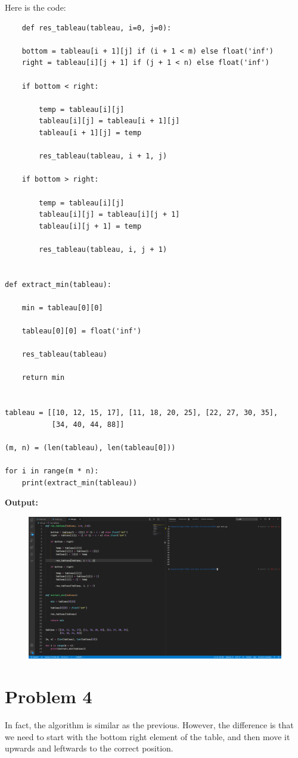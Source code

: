 \documentclass{article}
\begin{document}
Here is the code:
\begin{lstlisting}
    def res_tableau(tableau, i=0, j=0):

    bottom = tableau[i + 1][j] if (i + 1 < m) else float('inf')
    right = tableau[i][j + 1] if (j + 1 < n) else float('inf')

    if bottom < right:

        temp = tableau[i][j]
        tableau[i][j] = tableau[i + 1][j]
        tableau[i + 1][j] = temp

        res_tableau(tableau, i + 1, j)

    if bottom > right:

        temp = tableau[i][j]
        tableau[i][j] = tableau[i][j + 1]
        tableau[i][j + 1] = temp

        res_tableau(tableau, i, j + 1)


def extract_min(tableau):

    min = tableau[0][0]

    tableau[0][0] = float('inf')

    res_tableau(tableau)

    return min


tableau = [[10, 12, 15, 17], [11, 18, 20, 25], [22, 27, 30, 35],
           [34, 40, 44, 88]]

(m, n) = (len(tableau), len(tableau[0]))

for i in range(m * n):
    print(extract_min(tableau))

\end{lstlisting}

\textbf{Output:}
\begin{figure}[H]
    \includegraphics[width=1\textwidth]{Fig2}
\end{figure}

\section{Problem 4}
In fact, the algorithm is similar as the previous.
However, the difference is that we need to start with the bottom right element of the table, and then move it upwards and leftwards to the correct position.
\end{document}

